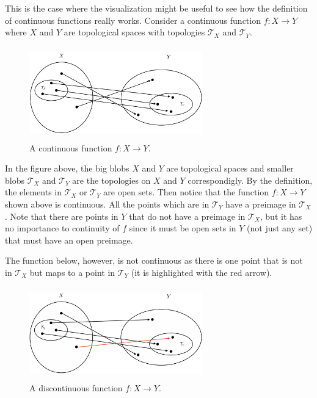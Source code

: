 \documentclass[a4paper, twocolumn]{article}
\newcommand{\topology}{\mathcal{T}}              %
\theoremstyle{definition}
\begin{document}
\medskip

This is the case where the visualization might be useful to see how the definition of continuous functions really works.
Consider a continuous function $f : X \to Y$ where $X$ and $Y$ are topological spaces with topologies $\topology_X$ and $\topology_Y$.

\begin{figure}[H]
    \centering
    \includegraphics[width=7.5cm, height=4cm]{continuous-function}
    \caption*{A continuous function $f : X \to Y$.}
\end{figure}

In the figure above, the big blobs $X$ and $Y$ are topological spaces and smaller blobs $\topology_X$
and $\topology_Y$ are the topologies on $X$ and $Y$ correspondigly. By the definition, the elements in $\topology_X$
or $\topology_Y$ are open sets. Then notice that the function $f : X \to Y$ shown above is continuous. All the points
which are in $\topology_Y$ have a preimage in $\topology_X$. Note that there are points in $Y$ that do not have a preimage
in $\topology_X$, but it has no importance to continuity of $f$ since it must be open sets in $Y$ (not just any set) that must
have an open preimage.

\medskip

The function below, however, is not continuous as there is one point that is not in $\topology_X$
but maps to a point in $\topology_Y$ (it is highlighted with the red arrow).

\begin{figure}[H]
    \centering
    \includegraphics[width=7.5cm, height=4cm]{discontinuous-function}
    \caption*{A discontinuous function $f : X \to Y$.}
\end{figure}
\end{document}
